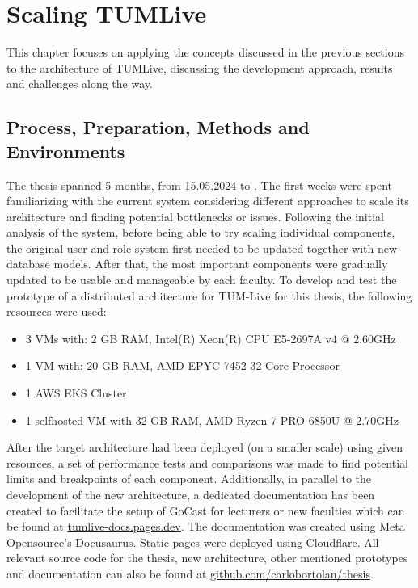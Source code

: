 
\chapter{Scaling TUMLive}\label{chapter:scaling_tumlive}

This chapter focuses on applying the concepts discussed in the previous sections to the architecture of TUMLive, discussing the development approach, results and challenges along the way. 

\section{Process, Preparation, Methods and Environments}

The thesis spanned 5 months, from 15.05.2024 to \getSubmissionDate{}. The first weeks were spent familiarizing with the current system considering different approaches to scale its architecture and finding potential bottlenecks or issues. Following the initial analysis of the system, before being able to try scaling individual components, the original user and role system first needed to be updated together with new database models. After that, the most important components were gradually updated to be usable and manageable by each faculty. 
To develop and test the prototype of a distributed architecture for TUM-Live for this thesis, the following resources were used:
\begin{itemize}
    \item 3 \ac{VM}s with: 2 GB RAM, Intel(R) Xeon(R) CPU E5-2697A v4 @ 2.60GHz
    \item 1 \ac{VM} with: 20 GB RAM, AMD EPYC 7452 32-Core Processor
    \item 1 \ac{AWS} \ac{EKS} Cluster
    \item 1 selfhosted \ac{VM} with 32 GB RAM, AMD Ryzen 7 PRO 6850U @ 2.70GHz
\end{itemize}

After the target architecture had been deployed (on a smaller scale) using given resources, a set of performance tests and comparisons was made to find potential limits and breakpoints of each component. 
Additionally, in parallel to the development of the new architecture, a dedicated documentation has been created to facilitate the setup of GoCast for lecturers or new faculties which can be found at \href{https://tumlive-docs.pages.dev/}{tumlive-docs.pages.dev}. The documentation was created using Meta Opensource's Docusaurus. Static pages were deployed using Cloudflare.
All relevant source code for the thesis, new architecture, other mentioned prototypes and documentation can also be found at \href{https://github.com/carlobortolan/thesis}{github.com/carlobortolan/thesis}.

